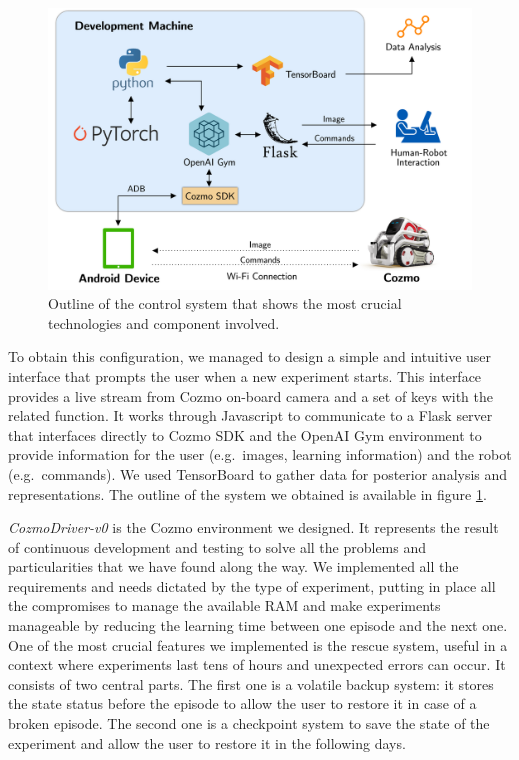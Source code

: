 \documentclass[10pt,twocolumn,letterpaper]{article}
\begin{document}
\begin{figure}[tbp]
    \centering
    \includegraphics[width=0.97\columnwidth]{cozmo-system.png}
    \caption[Outline of the control system]{Outline of the control system that shows the most crucial technologies and component involved.}
    \label{system}
\end{figure}

To obtain this configuration, we managed to design a simple and intuitive user interface that prompts the user when a new experiment starts.
This interface provides a live stream from Cozmo on-board camera and a set of keys with the related function.
It works through Javascript to communicate to a Flask server that interfaces directly to Cozmo SDK and the OpenAI Gym environment to provide information for the user (e.g.\ images, learning information) and the robot (e.g.\ commands).
We used TensorBoard to gather data for posterior analysis and representations.
The outline of the system we obtained is available in figure \ref{system}.

\textit{CozmoDriver-v0} is the Cozmo environment we designed.
It represents the result of continuous development and testing to solve all the problems and particularities that we have found along the way.
We implemented all the requirements and needs dictated by the type of experiment, putting in place all the compromises to manage the available RAM and make experiments manageable by reducing the learning time between one episode and the next one.
One of the most crucial features we implemented is the rescue system, useful in a context where experiments last tens of hours and unexpected errors can occur.
It consists of two central parts.
The first one is a volatile backup system: it stores the state status before the episode to allow the user to restore it in case of a broken episode.
The second one is a checkpoint system to save the state of the experiment and allow the user to restore it in the following days.
%
\end{document}
